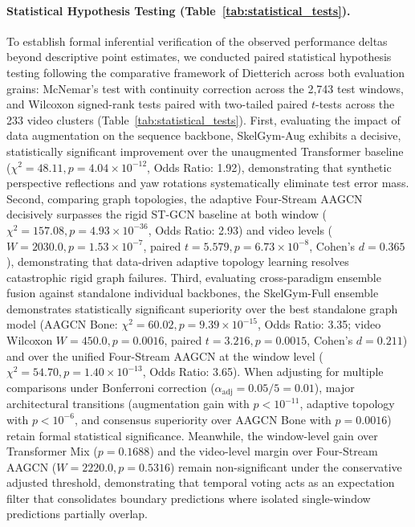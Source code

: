 \documentclass[preprint,12pt]{elsarticle}
\begin{document}
\paragraph{Statistical Hypothesis Testing (Table~\ref{tab:statistical_tests}).} To establish formal inferential verification of the observed performance deltas beyond descriptive point estimates, we conducted paired statistical hypothesis testing following the comparative framework of Dietterich \cite{dietterich1998} across both evaluation grains: McNemar's test with continuity correction \cite{mcnemar1947} across the 2,743 test windows, and Wilcoxon signed-rank tests \cite{wilcoxon1945} paired with two-tailed paired $t$-tests across the 233 video clusters (Table~\ref{tab:statistical_tests}).
First, evaluating the impact of data augmentation on the sequence backbone, SkelGym-Aug exhibits a decisive, statistically significant improvement over the unaugmented Transformer baseline ($\chi^2 = 48.11, p = 4.04 \times 10^{-12}$, Odds Ratio: 1.92), demonstrating that synthetic perspective reflections and yaw rotations systematically eliminate test error mass.
Second, comparing graph topologies, the adaptive Four-Stream AAGCN decisively surpasses the rigid ST-GCN baseline at both window ($\chi^2 = 157.08, p = 4.93 \times 10^{-36}$, Odds Ratio: 2.93) and video levels ($W = 2030.0, p = 1.53 \times 10^{-7}$, paired $t = 5.579, p = 6.73 \times 10^{-8}$, Cohen's $d = 0.365$), demonstrating that data-driven adaptive topology learning resolves catastrophic rigid graph failures.
Third, evaluating cross-paradigm ensemble fusion against standalone individual backbones, the SkelGym-Full ensemble demonstrates statistically significant superiority over the best standalone graph model (AAGCN Bone: $\chi^2 = 60.02, p = 9.39 \times 10^{-15}$, Odds Ratio: 3.35; video Wilcoxon $W = 450.0, p = 0.0016$, paired $t = 3.216, p = 0.0015$, Cohen's $d = 0.211$) and over the unified Four-Stream AAGCN at the window level ($\chi^2 = 54.70, p = 1.40 \times 10^{-13}$, Odds Ratio: 3.65). When adjusting for multiple comparisons under Bonferroni correction ($\alpha_{\text{adj}} = 0.05 / 5 = 0.01$), major architectural transitions (augmentation gain with $p < 10^{-11}$, adaptive topology with $p < 10^{-6}$, and consensus superiority over AAGCN Bone with $p = 0.0016$) retain formal statistical significance. Meanwhile, the window-level gain over Transformer Mix ($p = 0.1688$) and the video-level margin over Four-Stream AAGCN ($W = 2220.0, p = 0.5316$) remain non-significant under the conservative adjusted threshold, demonstrating that temporal voting acts as an expectation filter that consolidates boundary predictions where isolated single-window predictions partially overlap.
\end{document}
